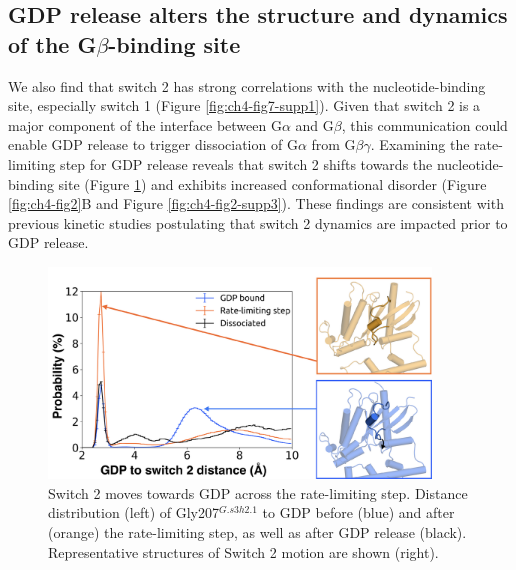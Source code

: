 \documentclass[../main.tex]{subfiles}
\begin{document}
    \subsection{GDP release alters the structure and dynamics of the G$\beta$-binding site}
        We also find that switch 2 has strong correlations with the nucleotide-binding site, especially switch 1 (Figure \ref{fig:ch4-fig7-supp1}). Given that switch 2 is a major component of the interface between G$\alpha$ and G$\beta$, this communication could enable GDP release to trigger dissociation of G$\alpha$ from G$\beta\gamma$. Examining the rate-limiting step for GDP release reveals that switch 2 shifts towards the nucleotide-binding site (Figure \ref{fig:ch4-fig10}) and exhibits increased conformational disorder (Figure \ref{fig:ch4-fig2}B and Figure \ref{fig:ch4-fig2-supp3}). These findings are consistent with previous kinetic studies postulating that switch 2 dynamics are impacted prior to GDP release\cite{Herrmann:2004gp}.

        \begin{figure}[!htb] %
            \centering
            \includegraphics[width=4in]{ch4-fig10.png}
            \caption[Switch 2 moves towards GDP across the rate-limiting step.]
                {Switch 2 moves towards GDP across the rate-limiting step. Distance distribution (left) of Gly207$^{G.s3h2.1}$ to GDP before (blue) and after (orange) the rate-limiting step, as well as after GDP release (black). Representative structures of Switch 2 motion are shown (right).}
            \label{fig:ch4-fig10}
        \end{figure}
\end{document}
